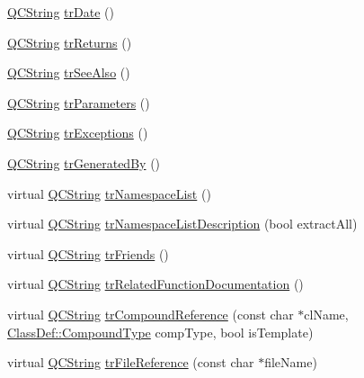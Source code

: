 \begin{DoxyCompactItemize}
\item 
\mbox{\hyperlink{class_q_c_string}{Q\+C\+String}} \mbox{\hyperlink{class_translator_portuguese_a8cf39fc583129912800db26379efe8b5}{tr\+Date}} ()
\item 
\mbox{\hyperlink{class_q_c_string}{Q\+C\+String}} \mbox{\hyperlink{class_translator_portuguese_ac3fed63636617d973fdb1e745e1ac65e}{tr\+Returns}} ()
\item 
\mbox{\hyperlink{class_q_c_string}{Q\+C\+String}} \mbox{\hyperlink{class_translator_portuguese_ad2a4a2483a58c22915bbe488d072afad}{tr\+See\+Also}} ()
\item 
\mbox{\hyperlink{class_q_c_string}{Q\+C\+String}} \mbox{\hyperlink{class_translator_portuguese_a0f900080af87aa9264e9b220c8ef623e}{tr\+Parameters}} ()
\item 
\mbox{\hyperlink{class_q_c_string}{Q\+C\+String}} \mbox{\hyperlink{class_translator_portuguese_a01f09c27b890470bffcde6e8274e3b71}{tr\+Exceptions}} ()
\item 
\mbox{\hyperlink{class_q_c_string}{Q\+C\+String}} \mbox{\hyperlink{class_translator_portuguese_a161fe78f84318411181b2cbe7d8f4f67}{tr\+Generated\+By}} ()
\item 
virtual \mbox{\hyperlink{class_q_c_string}{Q\+C\+String}} \mbox{\hyperlink{class_translator_portuguese_a115ac84d17a0ef69c3312e70fbc37086}{tr\+Namespace\+List}} ()
\item 
virtual \mbox{\hyperlink{class_q_c_string}{Q\+C\+String}} \mbox{\hyperlink{class_translator_portuguese_a644d9d810439ea4a7a16f7cf5eee664c}{tr\+Namespace\+List\+Description}} (bool extract\+All)
\item 
virtual \mbox{\hyperlink{class_q_c_string}{Q\+C\+String}} \mbox{\hyperlink{class_translator_portuguese_a81f30a769a23775437acbf7a5cca33c6}{tr\+Friends}} ()
\item 
virtual \mbox{\hyperlink{class_q_c_string}{Q\+C\+String}} \mbox{\hyperlink{class_translator_portuguese_a4e5b7585447dbdfb983640c410ff50e8}{tr\+Related\+Function\+Documentation}} ()
\item 
virtual \mbox{\hyperlink{class_q_c_string}{Q\+C\+String}} \mbox{\hyperlink{class_translator_portuguese_ae15304024883a04e35c5bc568d706b51}{tr\+Compound\+Reference}} (const char $\ast$cl\+Name, \mbox{\hyperlink{class_class_def_ae70cf86d35fe954a94c566fbcfc87939}{Class\+Def\+::\+Compound\+Type}} comp\+Type, bool is\+Template)
\item 
virtual \mbox{\hyperlink{class_q_c_string}{Q\+C\+String}} \mbox{\hyperlink{class_translator_portuguese_a80cd24e5a18febdbfb0d7e1e6552665f}{tr\+File\+Reference}} (const char $\ast$file\+Name)

\end{DoxyCompactItemize}
